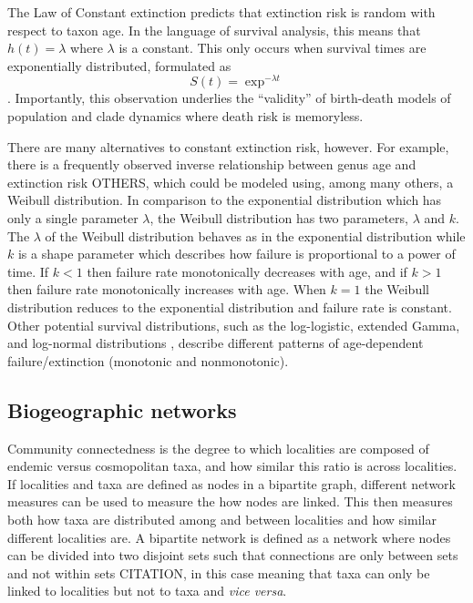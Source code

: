 \documentclass[12pt,letterpaper]{article}
\begin{document}

The Law of Constant extinction \citep{VanValen1973} predicts that extinction risk is random with respect to taxon age. In the language of survival analysis, this means that \(h(t) = \lambda\) where \(\lambda\) is a constant. This only occurs when survival times are exponentially distributed, formulated as 
\begin{equation}
  S(t) = \exp ^{- \lambda t}
  \label{eq:expsurv}
\end{equation}. Importantly, this observation underlies the ``validity'' of birth-death models of population and clade dynamics where death risk is memoryless.

There are many alternatives to constant extinction risk, however. For example, there is a frequently observed inverse relationship between genus age and extinction risk \citep{Finnegan2008} OTHERS, which could be modeled using, among many others, a Weibull distribution. In comparison to the exponential distribution which has only a single parameter \(\lambda\), the Weibull distribution has two parameters, \(\lambda\) and \(k\). The \(\lambda\) of the Weibull distribution behaves as in the exponential distribution while \(k\) is a shape parameter which describes how failure is proportional to a power of time. If \(k < 1\) then failure rate monotonically decreases with age, and if \(k > 1\) then failure rate monotonically increases with age. When \(k = 1\) the Weibull distribution reduces to the exponential distribution and failure rate is constant. Other potential survival distributions, such as the log-logistic, extended Gamma, and log-normal distributions \citep{Kleinbaum2005}, describe different patterns of age-dependent failure/extinction (monotonic and nonmonotonic).


\subsection{Biogeographic networks} \label{sec:bionet}
Community connectedness is the degree to which localities are composed of endemic versus cosmopolitan taxa, and how similar this ratio is across localities. If localities and taxa are defined as nodes in a bipartite graph, different network measures can be used to measure the how nodes are linked. This then measures both how taxa are distributed among and between localities and how similar different localities are. A bipartite network is defined as a network where nodes can be divided into two disjoint sets such that connections are only between sets and not within sets CITATION, in this case meaning that taxa can only be linked to localities but not to taxa and \textit{vice versa}.
\end{document}
